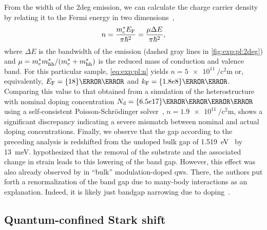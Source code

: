 From the width of the \gls{2deg} emission, we can calculate the charge carrier density by relating it to the Fermi energy in two dimensions~\cite{Pinczuk1984,Ihn2009},
\begin{equation}\label{eq:exp:pl:n}
    n = \frac{m^{\ast}_{\mathrm{c}}E_{\mathrm{F}}}{\pi\hbar^2} = \frac{\mu\Delta E}{\pi\hbar^2},
\end{equation}
where $\Delta E$ is the bandwidth of the emission (dashed gray lines in \cref{fig:exp:pl:2deg}) and $\mu = m^{\ast}_{\mathrm{c}}m^{\ast}_{\mathrm{hh}}/(m^{\ast}_{\mathrm{c}} + m^{\ast}_{\mathrm{hh}})$ is the reduced mass of conduction and valence band.
For this particular sample, \cref{eq:exp:pl:n} yields $n = \qty{5e11}{\per\square\centi\meter}$ or, equivalently, $E_{\mr{F}} = \qty{18}{\milli\electronvolt}$ and $k_{\mr{F}} = \qty{1.8e8}{\per\meter}$.
Comparing this value to that obtained from a simulation of the heterostructure with nominal doping concentration $N_{\mr{d}} = \qty{6.5e17}{\per\cubic\centi\meter}$ using a self-consistent Poisson-Schrödinger solver~\cite{PoissonSchroedinger}, $n = \qty{1.9e11}{\per\square\centi\meter}$, shows a significant discrepancy indicating a severe mismatch between nominal and actual doping concentrations.
Finally, we observe that the gap according to the preceding analysis is redshifted from the undoped bulk gap of \qty{1.519}{\electronvolt}~\cite{Vurgaftman2001} by \qty{13}{\milli\electronvolt}.
 hypothesized that the removal of the  substrate and the associated change in strain leads to this lowering of the band gap.
However, this effect was also already observed by \citet{Pinczuk1984} in \enquote{bulk} modulation-doped  \glspl{qw}.
There, the authors put forth a renormalization of the band gap due to many-body interactions as an explanation.
Indeed, it is likely just bandgap narrowing due to doping~\cite{Jain1992}. %

\subsection{Quantum-confined Stark shift}\label{subsec:exp:observations:pl:qcse}

